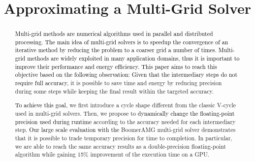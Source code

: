 \documentclass[10pt,conference]{IEEEtran}
\title{Approximating a Multi-Grid Solver}
\author{

    \IEEEauthorblockN{Valentin Le F\`{e}vre}
    \IEEEauthorblockA{
        \'{E}cole Normale Supérieure de Lyon\\
        valentin.le-fevre@ens-lyon.fr}
    \and
    \IEEEauthorblockN{Leonardo Bautista-Gomez}
    \IEEEauthorblockA{
        Barcelona Supercomputing Center (BSC)\\
        leonardo.bautista@bsc.es}
    \and
    \IEEEauthorblockN{Marc Casas}
    \IEEEauthorblockA{
        Barcelona Supercomputing Center (BSC)\\
        marc.casas@bsc.es}
}
\newcommand\leo[1]{\textcolor{black}{#1}}
\newcommand\ldo[1]{\ignorespaces}
\begin{document}
\maketitle
\begin{abstract}

    \leo{Multi-grid methods are numerical algorithms used in parallel and
    distributed processing. The main idea of multi-grid solvers is to speedup
    the convergence of an iterative method by reducing the problem to a coarser
    grid a number of times. Multi-grid methods are widely exploited in many
    application domains, thus it is important to improve  their performance and
    energy efficiency. This paper aims to reach this objective based on the
    following observation: Given that the intermediary steps do not require
    full accuracy,} it is possible to save time and energy by reducing
    precision during some steps while keeping the final result within the
    targeted accuracy.

    \leo{To achieve this goal,} we first introduce a cycle shape different from
    the classic V-cycle used in multi-grid solvers.  Then, we propose to
    \leo{dynamically change the floating-point precision used during runtime}
    according to the accuracy needed for each intermediary step.  \leo{Our
    large scale evaluation with the } BoomerAMG multi-grid solver demonstrates
    that it is possible to trade temporary precision for time to completion.
    In particular, we are able to reach the same accuracy results as a
    double-precision floating-point algorithm while gaining 15\% improvement of
    the execution time on a GPU.\ldo{Did we actually execute it on a GPU or
    just as abstract in the model?}

\end{abstract}



















\end{document}
